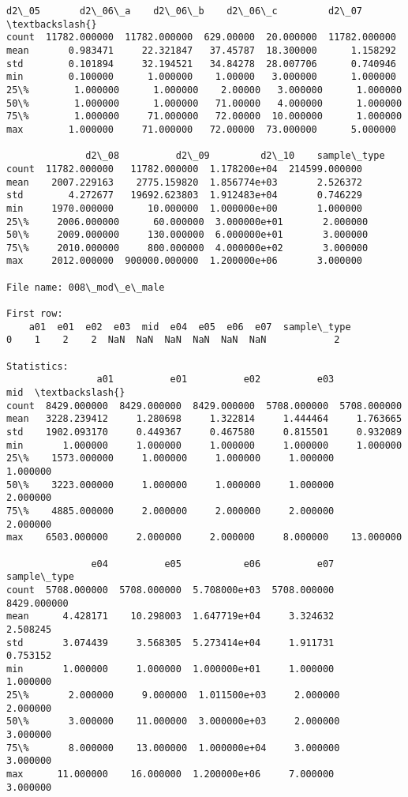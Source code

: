 \documentclass[11pt]{article}
\begin{document}
\begin{Verbatim}[commandchars=\\\{\}]
              d2\_05       d2\_06\_a    d2\_06\_b    d2\_06\_c         d2\_07  \textbackslash{}
count  11782.000000  11782.000000  629.00000  20.000000  11782.000000   
mean       0.983471     22.321847   37.45787  18.300000      1.158292   
std        0.101894     32.194521   34.84278  28.007706      0.740946   
min        0.100000      1.000000    1.00000   3.000000      1.000000   
25\%        1.000000      1.000000    2.00000   3.000000      1.000000   
50\%        1.000000      1.000000   71.00000   4.000000      1.000000   
75\%        1.000000     71.000000   72.00000  10.000000      1.000000   
max        1.000000     71.000000   72.00000  73.000000      5.000000   

              d2\_08          d2\_09         d2\_10    sample\_type  
count  11782.000000   11782.000000  1.178200e+04  214599.000000  
mean    2007.229163    2775.159820  1.856774e+03       2.526372  
std        4.272677   19692.623803  1.912483e+04       0.746229  
min     1970.000000      10.000000  1.000000e+00       1.000000  
25\%     2006.000000      60.000000  3.000000e+01       2.000000  
50\%     2009.000000     130.000000  6.000000e+01       3.000000  
75\%     2010.000000     800.000000  4.000000e+02       3.000000  
max     2012.000000  900000.000000  1.200000e+06       3.000000  

File name: 008\_mod\_e\_male

First row: 
    a01  e01  e02  e03  mid  e04  e05  e06  e07  sample\_type
0    1    2    2  NaN  NaN  NaN  NaN  NaN  NaN            2

Statistics: 
                a01          e01          e02          e03          mid  \textbackslash{}
count  8429.000000  8429.000000  8429.000000  5708.000000  5708.000000   
mean   3228.239412     1.280698     1.322814     1.444464     1.763665   
std    1902.093170     0.449367     0.467580     0.815501     0.932089   
min       1.000000     1.000000     1.000000     1.000000     1.000000   
25\%    1573.000000     1.000000     1.000000     1.000000     1.000000   
50\%    3223.000000     1.000000     1.000000     1.000000     2.000000   
75\%    4885.000000     2.000000     2.000000     2.000000     2.000000   
max    6503.000000     2.000000     2.000000     8.000000    13.000000   

               e04          e05           e06          e07  sample\_type  
count  5708.000000  5708.000000  5.708000e+03  5708.000000  8429.000000  
mean      4.428171    10.298003  1.647719e+04     3.324632     2.508245  
std       3.074439     3.568305  5.273414e+04     1.911731     0.753152  
min       1.000000     1.000000  1.000000e+01     1.000000     1.000000  
25\%       2.000000     9.000000  1.011500e+03     2.000000     2.000000  
50\%       3.000000    11.000000  3.000000e+03     2.000000     3.000000  
75\%       8.000000    13.000000  1.000000e+04     3.000000     3.000000  
max      11.000000    16.000000  1.200000e+06     7.000000     3.000000  


\end{Verbatim}
\end{document}
